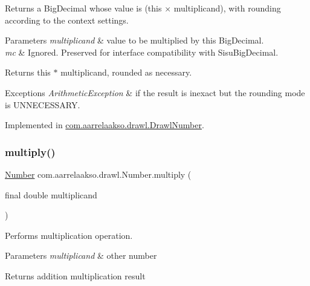 Returns a Big\+Decimal whose value is (this × multiplicand), with rounding according to the context settings. 


\begin{DoxyParams}{Parameters}
{\em multiplicand} & value to be multiplied by this Big\+Decimal. \\
\hline
{\em mc} & Ignored. Preserved for interface compatibility with Sisu\+Big\+Decimal. \\
\hline
\end{DoxyParams}
\begin{DoxyReturn}{Returns}
this $\ast$ multiplicand, rounded as necessary. 
\end{DoxyReturn}

\begin{DoxyExceptions}{Exceptions}
{\em Arithmetic\+Exception} & if the result is inexact but the rounding mode is U\+N\+N\+E\+C\+E\+S\+S\+A\+RY. \\
\hline
\end{DoxyExceptions}


Implemented in \hyperlink{classcom_1_1aarrelaakso_1_1drawl_1_1_drawl_number_a11144527a91f9a750b9042a3ac84f631}{com.\+aarrelaakso.\+drawl.\+Drawl\+Number}.

\mbox{\label{interfacecom_1_1aarrelaakso_1_1drawl_1_1_number_a47435944efde1dec963b401dbdf45d62}} 
\subsubsection{\texorpdfstring{multiply()}{multiply()}\hspace{0.1cm}{\footnotesize\ttfamily [3/3]}}
{\footnotesize\ttfamily \hyperlink{interfacecom_1_1aarrelaakso_1_1drawl_1_1_number}{Number} com.\+aarrelaakso.\+drawl.\+Number.\+multiply (\begin{DoxyParamCaption}\item[{final double}]{multiplicand }\end{DoxyParamCaption})}



Performs multiplication operation. 


\begin{DoxyParams}{Parameters}
{\em multiplicand} & other number \\
\hline
\end{DoxyParams}
\begin{DoxyReturn}{Returns}
addition multiplication result 
\end{DoxyReturn}



